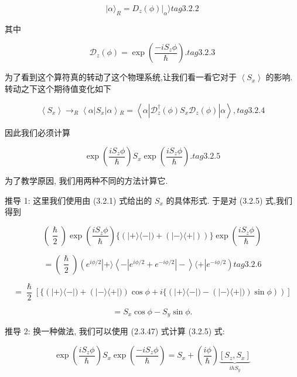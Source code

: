 $$
|\alpha {\rangle }_{R} = {\left. {D}_{z}\left( \phi \right) \right| }_{\alpha }\rangle tag{3.2.2}
$$

其中

$$
{\mathcal{D}}_{z}\left( \phi \right) = \exp \left( \frac{-i{S}_{z}\phi }{\hslash }\right) . tag{3.2.3}
$$

为了看到这个算符真的转动了这个物理系统,让我们看一看它对于 $\left\langle {S}_{x}\right\rangle$ 的影响. 转动之下这个期待值变化如下

$$
\left\langle {S}_{x}\right\rangle { \rightarrow }_{R}\left\langle {\alpha \left| {S}_{x}\right| \alpha }\right\rangle {}_{R} = \left\langle {\alpha \left| {{\mathcal{D}}_{z}^{ \dagger }\left( \phi \right) {S}_{x}{\mathcal{D}}_{z}\left( \phi \right) }\right| \alpha }\right\rangle , tag{3.2.4}
$$

因此我们必须计算

$$
\exp \left( \frac{i{S}_{z}\phi }{\hslash }\right) {S}_{x}\exp \left( \frac{i{S}_{z}\phi }{\hslash }\right) . tag{3. 2.5}
$$

为了教学原因, 我们用两种不同的方法计算它.

推导 1: 这里我们使用由 (3.2.1) 式给出的 ${S}_{x}$ 的具体形式. 于是对 (3.2.5) 式,我们得到

$$
\left( \frac{\hslash }{2}\right) \exp \left( \frac{i{S}_{z}\phi }{\hslash }\right) \{ \left( {\left| {+\rangle \langle - }\right| ) + \left( \left| {-\rangle \langle + }\right| \right) }\right) \} \exp \left( \frac{i{S}_{z}\phi }{\hslash }\right)
$$

$$
= \left( \frac{\hslash }{2}\right) \left( {{e}^{{i\phi }/2}\left| {+\rangle \left\langle {-\left| {{e}^{{i\phi }/2} + {e}^{-{i\phi }/2}}\right| - }\right\rangle \langle + }\right| {e}^{-{i\phi }/2}}\right) tag{3.2.6}
$$

$$
= \frac{\hslash }{2}\left\lbrack {\{ \left( {\left| {+\rangle \langle - }\right| ) + \left( {\left| {-\rangle \langle + }\right| )}\right) \cos \phi + i\{ \left( {\left| {+\rangle \langle - }\right| ) - \left( {\left| {-\rangle \langle + }\right| )}\right) \sin \phi }\right) }\right) }\right\rbrack
$$

$$
= {S}_{x}\cos \phi - {S}_{y}\sin \phi .
$$

推导 2: 换一种做法, 我们可以使用 (2.3.47) 式计算 (3.2.5) 式:

$$
\exp \left( \frac{i{S}_{z}\phi }{\hslash }\right) {S}_{x}\exp \left( \frac{-i{S}_{z}\phi }{\hslash }\right) = {S}_{x} + \left( \frac{i\phi }{\hslash }\right) \underset{{ih}{S}_{y}}{\underbrace{\left\lbrack {S}_{z},{S}_{x}\right\rbrack }}
$$


